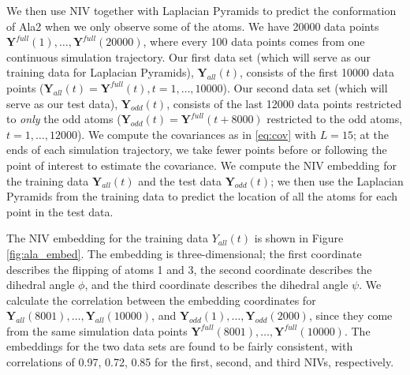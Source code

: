 \documentclass[aip,jcp,reprint,twocolumn]{revtex4-1}
\begin{document}
We then use NIV together with Laplacian Pyramids to predict the conformation of Ala2 when we only observe some of the atoms.
%
We have 20000 data points $\mathbf{Y}^{full}(1), \dots, \mathbf{Y}^{full}(20000)$, where every 100 data points comes from one continuous simulation trajectory.
%
Our first data set (which will serve as our training data for Laplacian Pyramids), $\mathbf{Y}_{all}(t)$, consists of the first 10000 data points ($\mathbf{Y}_{all}(t) = \mathbf{Y}^{full}(t), t=1, \dots, 10000$).
%
Our second data set (which will serve as our test data), $\mathbf{Y}_{odd}(t)$, consists of the last 12000 data points restricted to {\em only} the odd atoms ($\mathbf{Y}_{odd}(t) = \mathbf{Y}^{full}(t+8000)$ restricted to the odd atoms, $t = 1, \dots, 12000$).
%
We compute the covariances as in \eqref{eq:cov} with $L=15$;
at the ends of each simulation trajectory, we take fewer points before or following the point of interest to estimate the covariance.
%
We compute the NIV embedding for the training data $\mathbf{Y}_{all}(t)$ and the test data $\mathbf{Y}_{odd}(t)$; we then use the Laplacian Pyramids from the training data to predict the location of all the atoms for each point in the test data.

The NIV embedding for the training data $Y_{all}(t)$ is shown in Figure \ref{fig:ala_embed}.
%
The embedding is three-dimensional; the first coordinate describes the flipping of atoms 1 and 3, the second coordinate describes the dihedral angle $\phi$, and the third coordinate describes the dihedral angle $\psi$.
%
We calculate the correlation between the embedding coordinates for $\mathbf{Y}_{all}(8001), \dots, \mathbf{Y}_{all}(10000)$, and $\mathbf{Y}_{odd}(1), \dots, \mathbf{Y}_{odd}(2000)$,
since they come from the same simulation data points $\mathbf{Y}^{full}(8001), \dots, \mathbf{Y}^{full}(10000)$.
%
The embeddings for the two data sets are found to be fairly consistent, with correlations of 0.97, 0.72, 0.85 for the first, second, and third NIVs, respectively.

\end{document}
